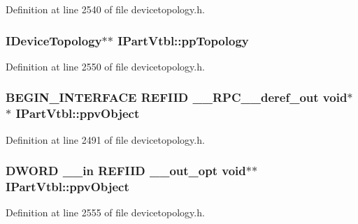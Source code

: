 Definition at line 2540 of file devicetopology.\+h.

\subsubsection[{\texorpdfstring{pp\+Topology}{ppTopology}}]{ {\bf I\+Device\+Topology}$\ast$$\ast$ I\+Part\+Vtbl\+::pp\+Topology}\hypertarget{struct_i_part_vtbl_afd679a49edb5f1f2acfaa6c9ecf93a64}{}\label{struct_i_part_vtbl_afd679a49edb5f1f2acfaa6c9ecf93a64}


Definition at line 2550 of file devicetopology.\+h.

\subsubsection[{\texorpdfstring{ppv\+Object}{ppvObject}}]{\setlength{\rightskip}{0pt plus 5cm}B\+E\+G\+I\+N\+\_\+\+I\+N\+T\+E\+R\+F\+A\+CE {\bf R\+E\+F\+I\+ID} {\bf \+\_\+\+\_\+\+R\+P\+C\+\_\+\+\_\+deref\+\_\+out} {\bf void}$\ast$$\ast$ I\+Part\+Vtbl\+::ppv\+Object}\hypertarget{struct_i_part_vtbl_aefa5beaf3ef646752b4c8638184c9736}{}\label{struct_i_part_vtbl_aefa5beaf3ef646752b4c8638184c9736}


Definition at line 2491 of file devicetopology.\+h.

\subsubsection[{\texorpdfstring{ppv\+Object}{ppvObject}}]{ {\bf D\+W\+O\+RD} {\bf \+\_\+\+\_\+in} {\bf R\+E\+F\+I\+ID} {\bf \+\_\+\+\_\+out\+\_\+opt} {\bf void}$\ast$$\ast$ I\+Part\+Vtbl\+::ppv\+Object}\hypertarget{struct_i_part_vtbl_a27f54b773ac4720d300ba6ed9f82a0f3}{}\label{struct_i_part_vtbl_a27f54b773ac4720d300ba6ed9f82a0f3}


Definition at line 2555 of file devicetopology.\+h.

